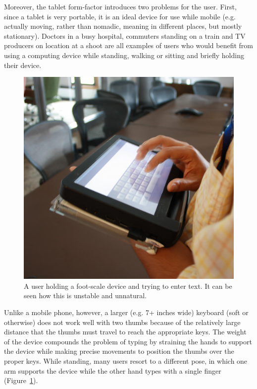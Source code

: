 Moreover, the tablet form-factor introduces two problems for the user.
First, since a tablet is very portable, it is an ideal device for use
while mobile (e.g. actually moving, rather than nomadic, meaning in
different places, but mostly stationary).  Doctors in a busy hospital,
commuters standing on a train and TV producers on location at a shoot
are all examples of users who would benefit from using a computing
device while standing, walking or sitting and briefly holding their
device.
\begin{figure}
    \includegraphics[scale=0.35]{Figures/device_hold.pdf} 
  	\caption{A user holding a foot-scale device and trying to enter text. It can be seen how this is unstable and unnatural.}
    \label{fig:device_hold}
\end{figure}
Unlike a mobile phone, however, a larger (e.g. 7+ inches wide)
keyboard (soft or otherwise) does not work well with two thumbs
because of the relatively large distance that the thumbs must travel
to reach the appropriate keys.   The weight of the device compounds
the problem of typing by straining the hands to support the device
while making precise movements to position the thumbs over the proper
keys. While standing, many users resort to a different pose, in which
one arm supports the device while the other hand types with a single
finger (Figure~\ref{fig:device_hold}). 


